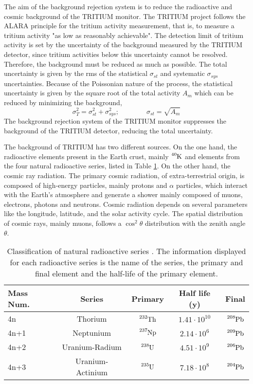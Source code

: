 The aim of the background rejection system is to reduce the radioactive and cosmic background of the TRITIUM monitor. The TRITIUM project follows the ALARA principle for the tritium activity measurement, that is, to measure a tritium activity "as low as reasonably achievable". The detection limit of tritium activity is set by the uncertainty of the background measured by the TRITIUM detector, since tritium activities below this uncertainty cannot be resolved. Therefore, the background must be reduced as much as possible. The total uncertainty is given by the rms of the statistical $\sigma_{st}$ and  systematic $\sigma_{sys}$ uncertainties. Because of the Poissonian nature of the process, the statistical uncertainty is given by the square root of the total activity $A_{m}$ which can be reduced by minimizing the background,
\begin{equation}
\sigma_{T}^2 = \sigma_{st}^2 +\sigma_{sys}^2; \qquad \qquad \sigma_{st} = \sqrt{A_{m}}
\label{eq:SquareSumUncerainty}
\end{equation} 
The background rejection system of the TRITIUM monitor suppresses the background of the TRITIUM detector, reducing the total uncertainty.

The background of TRITIUM has two different sources. On the one hand, the radioactive elements present in the Earth crust, mainly $\ce{^{40}K}$ and elements from the four natural radioactive series, listed in Table \ref{tab:NaturalRadioactiveSeries}. On the other hand, the cosmic ray radiation. The primary cosmic radiation, of extra-terrestrial origin, is composed of high-energy particles, mainly protons and $\alpha$ particles, which interact with the Earth's atmosphere and generate a shower mainly composed of muons, electrons, photons and neutrons. Cosmic radiation depends on several parameters like the longitude, latitude, and the solar activity cycle. The spatial distribution of cosmic rays, mainly muons, follows a $\cos^2\theta$ distribution with the zenith angle $\theta$. 

\begin{table}[htbp]
\centering{}%
\begin{tabular}{lcccc}
\toprule 
Mass Num. & Series & Primary & Half life (y) & Final \tabularnewline
\midrule
\midrule 
4n & Thorium & $\ce{^{232}Th}$ & $1.41 \cdot{} 10^{10}$ & $\ce{^{208}Pb}$ \tabularnewline
4n+1 & Neptunium & $\ce{^{237}Np}$ & $2.14 \cdot{} 10^{6}$ & $\ce{^{209}Pb}$ \tabularnewline
4n+2 & Uranium-Radium & $\ce{^{238}U}$ & $4.51 \cdot{} 10^{9}$ & $\ce{^{206}Pb}$ \tabularnewline
4n+3 & Uranium-Actinium & $\ce{^{235}U}$ & $7.18 \cdot{} 10^{8}$ & $\ce{^{204}Pb}$ \tabularnewline
\bottomrule
\end{tabular}
\caption{Classification of natural radioactive series \cite{NaturalRadioactiveSeries1, NaturalRadioactiveSeries2}. The information displayed for each radioactive series is the name of the series, the primary and final element and the half-life of the primary element.}
\label{tab:NaturalRadioactiveSeries}
\end{table}

